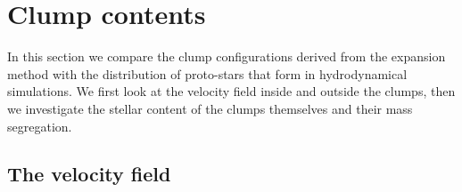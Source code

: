 \section{Clump contents}

In this section we compare the clump configurations derived from the \HubLem expansion method with the distribution of proto-stars that form in hydrodynamical simulations. We first look at the velocity field inside and outside the clumps, then we investigate the stellar content of the clumps themselves and their mass segregation.


\subsection{The velocity field}
\label{sec:velocityfield} 




